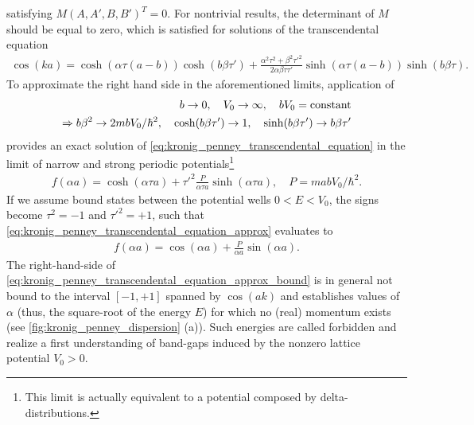 satisfying $M(A,A',B,B')^T=0$.
For nontrivial results, the determinant of $M$ should be equal to zero, which is satisfied for solutions of the transcendental equation
\begin{align}
    \cos(ka)
    =
    \cosh(\alpha\tau(a-b))\cosh(b\beta\tau')
    +
    \frac{\alpha^2\tau^2+\beta^2\tau'^2}{2\alpha\beta\tau\tau'}\sinh(\alpha\tau(a-b))\sinh(b\beta\tau).
    \label{eq:kronig_penney_transcendental_equation}
\end{align}
To approximate the right hand side in the aforementioned limits, application of
\begin{align}
    b\rightarrow0,
    \quad
    V_0\rightarrow\infty,
    \quad
    bV_0 = {\rm constant}
    \\
    \Rightarrow
    b\beta^2\rightarrow 2mbV_0/\hbar^2,
    \quad
    \cosh(b\beta\tau')\rightarrow 1,
    \quad
    \sinh(b\beta\tau')\rightarrow b\beta\tau'
\end{align}
provides an exact solution of \cref{eq:kronig_penney_transcendental_equation} in the limit of narrow and strong periodic potentials\footnote{This limit is actually equivalent to a potential composed by delta-distributions.}
\begin{align}
    f(\alpha a) = \cosh(\alpha\tau a) + \tau'^2\frac{P}{\alpha\tau a}\sinh(\alpha\tau a),
    \quad
    P=mabV_0/\hbar^2.
    \label{eq:kronig_penney_transcendental_equation_approx}
\end{align}
If we assume bound states between the potential wells $0<E<V_0$, the signs become $\tau^2=-1$ and $\tau'^2=+1$, such that \cref{eq:kronig_penney_transcendental_equation_approx} evaluates to
\begin{align}
    f(\alpha a) = \cos(\alpha a) + \frac{P}{\alpha a}\sin(\alpha a).
    \label{eq:kronig_penney_transcendental_equation_approx_bound}
\end{align}
The right-hand-side of \cref{eq:kronig_penney_transcendental_equation_approx_bound} is in general not bound to the interval $[-1,+1]$ spanned by $\cos(ak)$ and establishes values of $\alpha$ (thus, the square-root of the energy $E$) for which no (real) momentum exists (see \cref{fig:kronig_penney_dispersion} (a)).
Such energies are called forbidden and realize a first understanding of band-gaps induced by the nonzero lattice potential $V_0>0$.
\\

